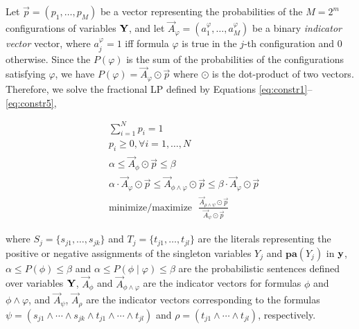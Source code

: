 \documentclass{article}
\begin{document}
Let $\Vec{p}=(p_1,\ldots,p_M)$ be a vector representing the probabilities of the $M=2^{m}$ configurations of variables $\mathbf{Y}$, and let $\Vec{A}_{\varphi}=(a_1^{\varphi},\ldots,a_{M}^{\varphi})$ be a binary \emph{indicator vector} vector, where $a_j^{\varphi} = 1$ iff formula $\varphi$ is true in the $j$-th configuration and $0$ otherwise. Since the $P(\varphi)$ is the sum of the probabilities of the configurations satisfying $\varphi$, we have $P(\varphi) = \Vec{A}_{\varphi} \odot \Vec{p}$ where $\odot$ is the dot-product of two vectors. Therefore, we solve the fractional LP defined by Equations \ref{eq:constr1}--\ref{eq:constr5}, 
\begin{figure}
\vspace{-1.1\baselineskip} %
\begin{minipage}{0.54\textwidth}
\begin{align}
    & \sum_{i=1}^{N} p_i = 1 \label{eq:constr1} \\
    & p_i \geq 0, \forall i=1,\ldots, N \label{eq:constr2}\\
    & \alpha \leq \Vec{A}_\phi \odot \Vec{p} \leq \beta \label{eq:constr3}\\
    & \alpha \cdot \Vec{A}_\varphi \odot \Vec{p} \leq \Vec{A}_{\phi \wedge \varphi}\odot \Vec{p} \leq \beta \cdot \Vec{A}_{\varphi}\odot \Vec{p} \label{eq:constr4}\\
    & \textrm{minimize/maximize~~} \frac{\Vec{A}_{\rho \wedge \psi}\odot \Vec{p}}{\Vec{A}_{\psi}\odot \Vec{p}} \label{eq:constr5}
\end{align}
\end{minipage}
\vspace{-0.9\baselineskip} %
\end{figure}
%
where $S_j=\{s_{j1},\ldots,s_{jk}\}$ and $T_j=\{t_{j1},\ldots,t_{jl}\}$ are the literals representing the positive or negative assignments of the singleton variables $Y_j$ and $\mathbf{pa}(Y_j)$ in $\mathbf{y}$, $\alpha \leq P(\phi) \leq \beta$ and $\alpha \leq P(\phi \mid \varphi) \leq \beta$ are the probabilistic sentences defined over variables $\mathbf{Y}$, $\Vec{A}_\phi$ and $\Vec{A}_{\phi \wedge \varphi}$ are the indicator vectors for formulas $\phi$ and $\phi \wedge \varphi$, and $\Vec{A}_{\psi}$, $\Vec{A}_{\rho}$ are the indicator vectors corresponding to the formulas 
$\psi = (s_{j1}\wedge\cdots \wedge s_{jk} \wedge t_{j1} \wedge \cdots \wedge t_{jl})$ and $\rho = (t_{j1} \wedge \cdots \wedge t_{jl})$, respectively.
\end{document}
